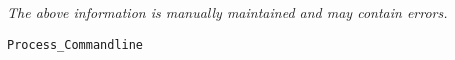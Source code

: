 \label{pkg:process\_commandline}

{\tiny \it The above information is manually maintained and may contain errors.}
\begin{verbatim}
Process_Commandline
\end{verbatim}
